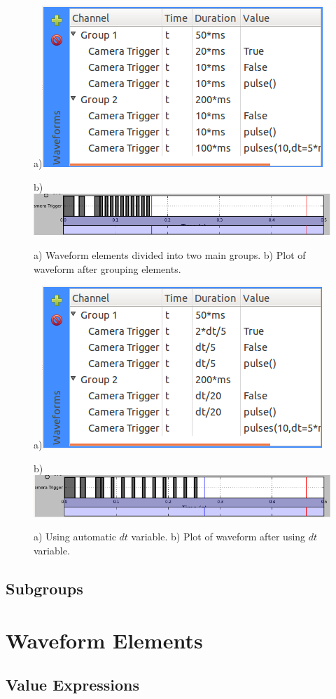 \begin{figure}[ht]
  \centerline{a)\includegraphics[width=.5\textwidth]{figures/waveform-5}}
  \centerline{b)\includegraphics[width=.8\textwidth]{figures/plot-5}}
  \caption{a) Waveform elements divided into two main groups. b) Plot of
  waveform after grouping elements.}
  \label{fig:quick:waveform-5}
\end{figure}

\begin{figure}[ht]
  \centerline{a)\includegraphics[width=.5\textwidth]{figures/waveform-6}}
  \centerline{b)\includegraphics[width=.8\textwidth]{figures/plot-6}}
  \caption{a) Using automatic $dt$ variable. b) Plot of waveform after
  using $dt$ variable.}
  \label{fig:quick:waveform-6}
\end{figure}

\subsection{Subgroups}


\section{Waveform Elements}
\subsection{Value Expressions}

